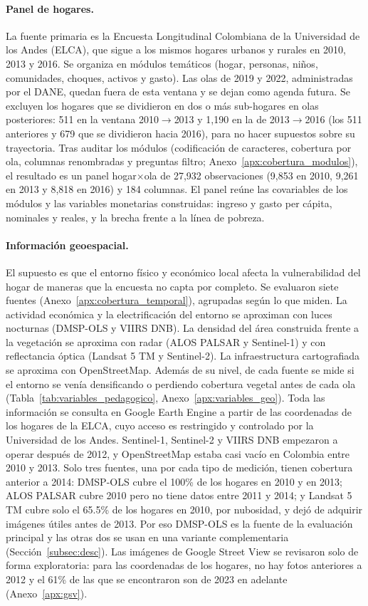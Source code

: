\documentclass[12pt, letterpaper]{article}
\begin{document}
\paragraph{Panel de hogares.} La fuente primaria es la Encuesta
Longitudinal Colombiana de la Universidad de los Andes (ELCA), que sigue
a los mismos hogares urbanos y rurales en 2010, 2013 y 2016. Se organiza
en módulos temáticos (hogar, personas, niños, comunidades, choques,
activos y gasto). Las olas de 2019 y 2022, administradas por el DANE,
quedan fuera de esta ventana y se dejan como agenda futura. Se
excluyen los hogares que se dividieron en dos o más sub-hogares en olas
posteriores: 511 en la ventana 2010$\to$2013 y 1{,}190 en la de 2013$\to$2016
(los 511 anteriores y 679 que se dividieron hacia 2016),
para no hacer supuestos sobre su trayectoria. Tras auditar los módulos
(codificación de caracteres, cobertura por ola, columnas renombradas y
preguntas filtro; Anexo~\ref{apx:cobertura_modulos}), el resultado es un
panel hogar$\times$ola de 27{,}932 observaciones (9{,}853 en 2010, 9{,}261
en 2013 y 8{,}818 en 2016) y 184 columnas. El panel reúne las covariables
de los módulos y las variables monetarias construidas: ingreso y gasto per cápita,
nominales y reales, y la brecha frente a la línea de pobreza.

\paragraph{Información geoespacial.} El supuesto es que el entorno
físico y económico local afecta la vulnerabilidad del hogar de maneras
que la encuesta no capta por completo. Se evaluaron siete fuentes
(Anexo~\ref{apx:cobertura_temporal}), agrupadas según lo que miden. La
actividad económica y la electrificación del entorno se aproximan con
luces nocturnas (DMSP-OLS y VIIRS DNB). La densidad del área construida
frente a la vegetación se aproxima con radar (ALOS PALSAR y Sentinel-1)
y con reflectancia óptica (Landsat 5 TM y Sentinel-2). La infraestructura
cartografiada se aproxima con OpenStreetMap. Además de su nivel, de cada
fuente se mide si el entorno se venía densificando o perdiendo cobertura
vegetal antes de cada ola (Tabla~\ref{tab:variables_pedagogico},
Anexo~\ref{apx:variables_geo}). Toda las información se consulta en Google
Earth Engine a partir de las coordenadas de los hogares de la ELCA, cuyo
acceso es restringido y controlado por la Universidad de los Andes.
Sentinel-1, Sentinel-2 y VIIRS DNB empezaron a operar después de 2012, y
OpenStreetMap estaba casi vacío en Colombia entre 2010 y 2013. Solo tres
fuentes, una por cada tipo de medición, tienen cobertura anterior a 2014:
DMSP-OLS cubre el 100\% de los hogares en 2010 y en 2013; ALOS PALSAR
cubre 2010 pero no tiene datos entre 2011 y 2014; y Landsat 5 TM cubre
solo el 65.5\% de los hogares en 2010, por nubosidad, y dejó de adquirir
imágenes útiles antes de 2013. Por eso DMSP-OLS es la fuente de la
evaluación principal y las otras dos se usan en una variante
complementaria (Sección~\ref{subsec:desc}). Las imágenes de Google Street
View se revisaron solo de forma exploratoria: para las coordenadas de los hogares, 
no hay fotos anteriores a 2012 y el 61\% de las que se encontraron
son de 2023 en adelante (Anexo~\ref{apx:gsv}).
\end{document}
